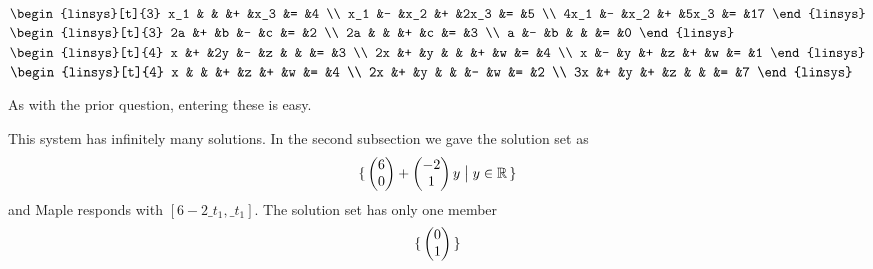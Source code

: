 \begin{exercises}
\begin{exparts*}
      \partsitem \( \begin{linsys}[t]{3}
                   x_1  &   &     &+  &x_3   &=  &4  \\
                   x_1  &-  &x_2  &+  &2x_3  &=  &5  \\
                  4x_1  &-  &x_2  &+  &5x_3  &=  &17  
                   \end{linsys}  \)
      \partsitem \( \begin{linsys}[t]{3}
                   2a   &+  &b    &-  &c     &=  &2  \\
                   2a   &   &     &+  &c     &=  &3  \\
                    a   &-  &b    &   &      &=  &0   
                    \end{linsys}  \)
      \partsitem \( \begin{linsys}[t]{4}
                     x  &+  &2y   &-   &z   &    &    &=  &3  \\
                    2x  &+  &y    &    &    &+   &w   &=  &4  \\
                     x  &-  &y    &+   &z   &+   &w   &=  &1  
                    \end{linsys}  \)
      \partsitem \( \begin{linsys}[t]{4}
                     x  &   &     &+   &z   &+   &w   &=  &4  \\
                    2x  &+  &y    &    &    &-   &w   &=  &2  \\
                    3x  &+  &y    &+   &z   &    &    &=  &7  
                     \end{linsys}  \)
    \end{exparts*}
    \begin{answer}
      As with the prior question, entering these is easy.
      \begin{exparts}
        \partsitem This system has infinitely many solutions. 
              In the second subsection we gave the solution set as
              \begin{equation*}
              \mbox{$\{\,\begin{pmatrix} 6 \\ 0 \end{pmatrix}+\begin{pmatrix} -2 \\ 1 \end{pmatrix}y
                      \bigm| y\in\mathbb{R}\,\}$}
              \end{equation*}
              and Maple responds with $[6-2\_t_1,\_t_1]$.
        \partsitem The solution set has only one member
          \begin{equation*}
             \set{\colvec{0 \\ 1} }

\end{equation*}
\end{exparts}
\end{answer}
\end{exercises}

